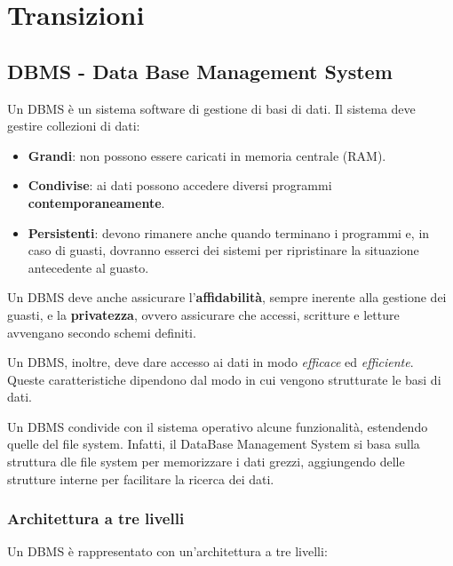\documentclass[11pt]{report}
\begin{document}
\customtitlepage
\newpage
\tableofcontents

\chapter{Transizioni}

\section{DBMS - Data Base Management System}

Un DBMS \`e un sistema software di gestione di basi di dati. Il sistema deve gestire collezioni di dati:
\begin{itemize}
\item \textbf{Grandi}: non possono essere caricati in memoria centrale (RAM).
\item \textbf{Condivise}: ai dati possono accedere diversi programmi \textbf{contemporaneamente}.
\item \textbf{Persistenti}: devono rimanere anche quando terminano i programmi e, in caso di guasti, dovranno esserci dei sistemi per ripristinare la situazione antecedente al guasto.
\end{itemize}
Un DBMS deve anche assicurare l'\textbf{affidabilit\`a}, sempre inerente alla gestione dei guasti, e la \textbf{privatezza}, ovvero assicurare che accessi, scritture e letture avvengano secondo schemi definiti.

Un DBMS, inoltre, deve dare accesso ai dati in modo \emph{efficace} ed \emph{efficiente}. Queste caratteristiche dipendono dal modo in cui vengono strutturate le basi di dati. 

Un DBMS condivide con il sistema operativo alcune funzionalit\`a, estendendo quelle del file system. Infatti, il DataBase Management System si basa sulla struttura dle file system per memorizzare i dati grezzi, aggiungendo delle strutture interne per facilitare la ricerca dei dati.

\subsection{Architettura a tre livelli}

Un DBMS \`e rappresentato con un'architettura a tre livelli:
\begin{center}
\end{center}
\end{document}
